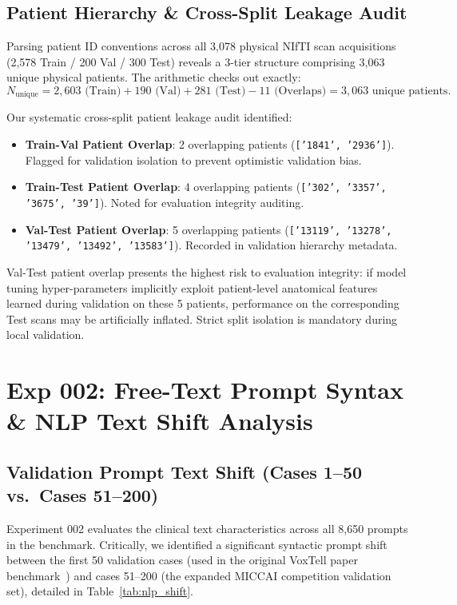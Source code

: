 \documentclass[11pt,a4paper]{article}
\begin{document}
\subsection{Patient Hierarchy \& Cross-Split Leakage Audit}
Parsing patient ID conventions across all 3,078 physical NIfTI scan acquisitions (2,578 Train / 200 Val / 300 Test) reveals a 3-tier structure comprising 3,063 unique physical patients. The arithmetic checks out exactly:
\begin{equation}
N_{\text{unique}} = 2,603 \text{ (Train)} + 190 \text{ (Val)} + 281 \text{ (Test)} - 11 \text{ (Overlaps)} = 3,063 \text{ unique patients}.
\end{equation}

Our systematic cross-split patient leakage audit identified:
\begin{itemize}
    \item \textbf{Train-Val Patient Overlap}: 2 overlapping patients (\texttt{['1841', '2936']}). Flagged for validation isolation to prevent optimistic validation bias.
    \item \textbf{Train-Test Patient Overlap}: 4 overlapping patients (\texttt{['302', '3357', '3675', '39']}). Noted for evaluation integrity auditing.
    \item \textbf{Val-Test Patient Overlap}: 5 overlapping patients (\texttt{['13119', '13278', '13479', '13492', '13583']}). Recorded in validation hierarchy metadata.
\end{itemize}

Val-Test patient overlap presents the highest risk to evaluation integrity: if model tuning hyper-parameters implicitly exploit patient-level anatomical features learned during validation on these 5 patients, performance on the corresponding Test scans may be artificially inflated. Strict split isolation is mandatory during local validation.

\section{Exp 002: Free-Text Prompt Syntax \& NLP Text Shift Analysis}

\subsection{Validation Prompt Text Shift (Cases 1--50 vs.\ Cases 51--200)}
Experiment 002 evaluates the clinical text characteristics across all 8,650 prompts in the benchmark. Critically, we identified a significant syntactic prompt shift between the first 50 validation cases (used in the original VoxTell paper benchmark~\cite{luo2025voxtell}) and cases 51--200 (the expanded MICCAI competition validation set), detailed in Table~\ref{tab:nlp_shift}.
\end{document}
